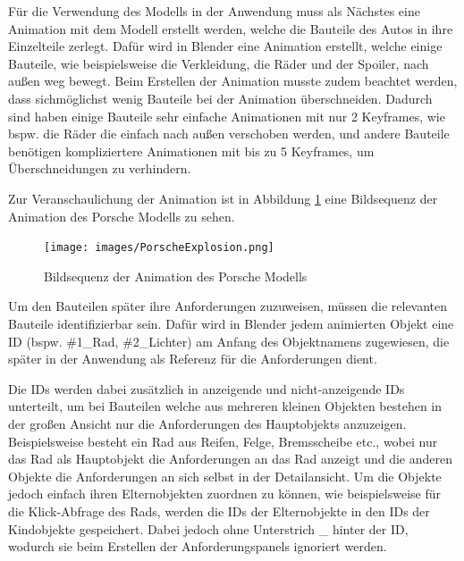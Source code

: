Für die Verwendung des Modells in der Anwendung muss als Nächstes eine Animation mit dem Modell erstellt werden, welche die Bauteile des Autos in ihre Einzelteile zerlegt.
Dafür wird in Blender eine Animation erstellt, welche einige Bauteile, wie beispielsweise die Verkleidung, die Räder und der Spoiler, nach außen weg bewegt.
Beim Erstellen der Animation musste zudem beachtet werden, dass sichmöglichst wenig Bauteile bei der Animation überschneiden.
Dadurch sind haben einige Bauteile sehr einfache Animationen mit nur 2 Keyframes, wie bspw. die Räder die einfach nach außen verschoben werden, und andere Bauteile benötigen kompliziertere Animationen mit bis zu 5 Keyframes, um Überschneidungen zu verhindern.

Zur Veranschaulichung der Animation ist in Abbildung \ref{fig:porsche-explosion} eine Bildsequenz der Animation des Porsche Modells zu sehen.

\begin{figure}[H]
    \centering
    \texttt{[image: images/PorscheExplosion.png]}
    \caption{Bildsequenz der Animation des Porsche Modells}
    \label{fig:porsche-explosion}
\end{figure}

Um den Bauteilen später ihre Anforderungen zuzuweisen, müssen die relevanten Bauteile identifizierbar sein.
Dafür wird in Blender jedem animierten Objekt eine ID (bspw. \#1\_Rad, \#2\_Lichter) am Anfang des Objektnamens zugewiesen, die später in der Anwendung als Referenz für die Anforderungen dient.

Die IDs werden dabei zusätzlich in anzeigende und nicht-anzeigende IDs unterteilt, um bei Bauteilen welche aus mehreren kleinen Objekten bestehen in der großen Ansicht nur die Anforderungen des Hauptobjekts anzuzeigen.
Beispielsweise besteht ein Rad aus Reifen, Felge, Bremsscheibe etc., wobei nur das Rad als Hauptobjekt die Anforderungen an das Rad anzeigt und die anderen Objekte die Anforderungen an sich selbst in der Detailansicht.
Um die Objekte jedoch einfach ihren Elternobjekten zuordnen zu können, wie beispielsweise für die Klick-Abfrage des Rads, werden die IDs der Elternobjekte in den IDs der Kindobjekte gespeichert.
Dabei jedoch ohne Unterstrich \glqq{}\_\grqq{} hinter der ID, wodurch sie beim Erstellen der Anforderungspanels ignoriert werden.

